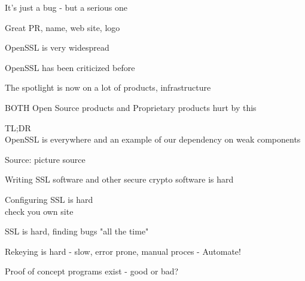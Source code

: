 \documentclass[20pt,landscape,a4paper,footrule]{foils}
\begin{document}
\vskip 1cm
\centerline{It's just a bug - but a serious one}


\begin{list1}
\item Great PR, name, web site, logo
\item OpenSSL is very widespread
\item OpenSSL has been criticized before
\item The spotlight is now on a lot of products, infrastructure
\item BOTH Open Source products and Proprietary products hurt by this
\item TL;DR\\ OpenSSL is everywhere and an example of our dependency on weak components
\end{list1}


Source: picture source\\ {\footnotesize{}}
\begin{list2}
\item Writing SSL software and other secure crypto software is hard
\item Configuring SSL is hard\\
check you own site 
\item SSL is hard, finding bugs "all the time"
\item Rekeying is hard - slow, error prone, manual proces - Automate!
\item Proof of concept programs exist - good or bad?
\end{list2}

\end{document}
